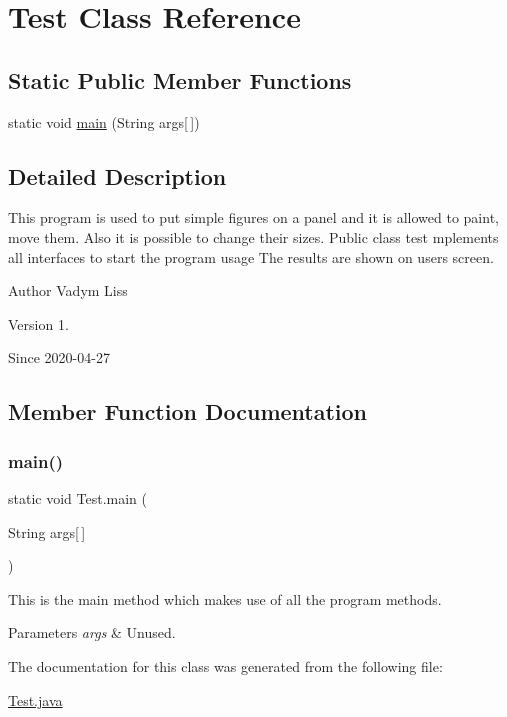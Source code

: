 \hypertarget{class_test}{}\section{Test Class Reference}
\label{class_test}
\subsection*{Static Public Member Functions}
\begin{DoxyCompactItemize}
\item 
static void \mbox{\hyperlink{class_test_af4b9dbf8bbb67093f6df9c0c5c06e75c}{main}} (String args\mbox{[}$\,$\mbox{]})
\end{DoxyCompactItemize}


\subsection{Detailed Description}
This program is used to put simple figures on a panel and it is allowed to paint, move them. Also it is possible to change their sizes. Public class test mplements all interfaces to start the program usage The results are shown on user\textquotesingle{}s screen. 

\begin{DoxyAuthor}{Author}
Vadym Liss 
\end{DoxyAuthor}
\begin{DoxyVersion}{Version}
1. 
\end{DoxyVersion}
\begin{DoxySince}{Since}
2020-\/04-\/27 
\end{DoxySince}


\subsection{Member Function Documentation}
\mbox{\label{class_test_af4b9dbf8bbb67093f6df9c0c5c06e75c}} 
\subsubsection{\texorpdfstring{main()}{main()}}
{\footnotesize\ttfamily static void Test.\+main (\begin{DoxyParamCaption}\item[{String}]{args\mbox{[}$\,$\mbox{]} }\end{DoxyParamCaption})\hspace{0.3cm}{\ttfamily [static]}}

This is the main method which makes use of all the program methods. 
\begin{DoxyParams}{Parameters}
{\em args} & Unused. \\
\hline
\end{DoxyParams}


The documentation for this class was generated from the following file\+:\begin{DoxyCompactItemize}
\item 
\mbox{\hyperlink{_test_8java}{Test.\+java}}\end{DoxyCompactItemize}
